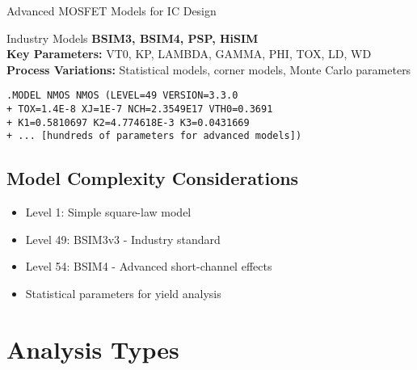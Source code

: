 \documentclass{beamer}
\begin{document}
\begin{frame}{Advanced MOSFET Models for IC Design}
    \begin{alertblock}{Industry Models}
        \textbf{BSIM3, BSIM4, PSP, HiSIM} \\
        \textbf{Key Parameters:} VT0, KP, LAMBDA, GAMMA, PHI, TOX, LD, WD \\
        \textbf{Process Variations:} Statistical models, corner models, Monte Carlo parameters
    \end{alertblock}
    
    \begin{lstlisting}[fontsize=\tiny]
.MODEL NMOS NMOS (LEVEL=49 VERSION=3.3.0
+ TOX=1.4E-8 XJ=1E-7 NCH=2.3549E17 VTH0=0.3691
+ K1=0.5810697 K2=4.774618E-3 K3=0.0431669
+ ... [hundreds of parameters for advanced models])
    \end{lstlisting}
    
    \subsection{Model Complexity Considerations}
    \begin{itemize}
        \item Level 1: Simple square-law model
        \item Level 49: BSIM3v3 - Industry standard
        \item Level 54: BSIM4 - Advanced short-channel effects
        \item Statistical parameters for yield analysis
    \end{itemize}
\end{frame}

\section{Analysis Types}
\end{document}
